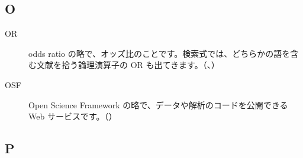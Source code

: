 \subsection*{O}
\begin{description}
\item[OR] odds ratio の略で、オッズ比のことです。検索式では、どちらかの語を含む文献を拾う論理演算子の OR も出てきます。（、）
\item[OSF] Open Science Framework の略で、データや解析のコードを公開できる Web サービスです。（）
\end{description}

\subsection*{P}
